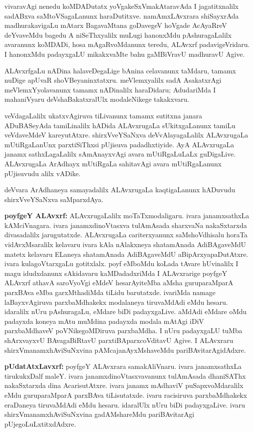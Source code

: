 vivaravAgi nenedu koMDADutatx yoVgakeSxVmakAtaravAda I jagatitxnalilx sadABxva saMtoVSagaLanunx haraDutitxve. namAmxLAvxrara shiSayxrAda madhurakavigaLu mAtarx BagavaMtana goDavegeV hoVgade AcAyaRreV deYvaveMdu bagedu A niSeThxyalilx muLugi hanonxMdu pAshuragaLalilx avaranunx koMDADi, hosa mAgaRvoMdanunx teredu, ALAvxrf padavigeVridaru. I hanonxMdu padayxgaLU mikakxvaMte bahu gaMBiVravU madhuravU Agive.

ALAvxrfgaLu nADina halaveDegaLige bAnina celavanunx taMdaru, tamamx nuDige apUvaR shoVBeyaninxtatxru. meVlemxyalilx sadA AsakatxrAgi meVlemxYyolavanunx tamamx nADinalilx haraDidaru; AdudariMda I mahaniVyaru deVshaBakatxralUlx modaleNikege takakxvaru.

veVdagaLalilx ukatxvAgiruva tiLivanunx tamamx sutitxna janara ADuBASeyAda tamiLinalilx hADida ALAvxrugaLa sUkitxgaLanunx tamiLu veVdaveMdeV kareyutAtxre. shirxVveYSaNxva deVvAlayagaLalilx ALAvxrugaLa mUtiRgaLanUnx parxtiSiThxsi pUjisuva padadhxtiyide. AyA ALAvxrugaLa janamx sathxLagaLalilx sAmAnayxvAgi avara mUtiRgaLuLaLx guDigaLive. ALAvxrugaLa ArAdhayx mUtiRgaLa sahitavAgi avara mUtiRgaLanunx pUjisuvudu alilx vADike.

deVvara ArAdhaneya samayadalilx ALAvxrugaLa kaqtigaLanunx hADuvudu shirxVveYSaNxva saMparxdAya.

{\textbf {poyfgeY ALAvxrf:}} ALAvxrugaLalilx moTaTxmodaligaru. ivara janamxsathxLa kAMciVnagara. ivara janamxdinoVtasxva tulAmAsada sharxvaNa nakaSxtarxda divasadalilx jarugutatxde. ALAvxrugaLa cariterxyanunx saMshoVdhisalu horaTa vidAvxMsaralilx kelavaru ivara kAla nAlakxneya shatamAnada AdiBAgaveMdU matetx kelavaru ELaneya shatamAnada AdiBAgaveMdU aBipArxyapaDutAtxre. ivara kulagoVtarxgaLu gotitxlalx. poyf eMboMdu koLada tAvare hUvinalilx I magu idudxdanunx sAkidavaru kaMDadadxriMda I ALAvxrarige poyfgeY ALAvxrf athavA saroVyoVgi eMdeV hesarAyiteMba aMsha guruparaMparA parxBAva eMba garxMthadiMda tiLidu barutatxde. ivariMda namage laBayxvAgiruva parxbaMdhakekx modalaneya tiruvaMdAdi eMdu hesaru. idaralilx nUru pAshuragaLu, eMdare biDi padayxgaLive. aMdAdi eMdare oMdu padayxda koneya mAtu muMdina padayxda modala mAtAgi iDiV parxbaMdhaveV poVNikegoMDiruva parxbaMdha. I nUru padayxgaLU tuMba shArxvayxvU BAvagaBiRtavU parxtiBAparxcoVditavU Agive. I ALAvxraru shirxVmanamxhAviSuNxvina pAMcajanAyxMshaveMdu pariBAvitarAgidAdxre.

{\large\textbf {pUdatAtxLavxrf:}} poyfgeY ALAvxrara samakAliVnaru. ivara janamxsathxLa tirukukxDalf maleY. ivara janamxdinoVtasxvavanunx tulAmAsada dhaniSAThx nakaSxtarxda dina AcarisutAtxre. ivara janamx mAdhaviV puSapxvoMdaralilx eMdu guruparaMparA parxBAva tiLisutatxde. ivaru racisiruva parxbaMdhakekx eraDaneya tiruvaMdAdi eMdu hesaru. idaralUlx nUru biDi padayxgaLive. ivaru shirxVmanamxhAviSuNxvina gadAMshareMdu pariBAvitarAgi pUjegoLuLxtitxdAdxre.

